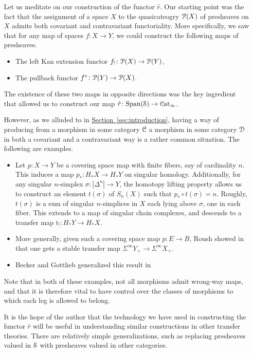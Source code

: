 \documentclass[main.tex]{subfiles}
\begin{document}
Let us meditate on our construction of the functor $\hat{r}$. Our starting point was the fact that the assignment of a space $X$ to the quasicateogry $\P(X)$ of presheaves on $X$ admits both covariant and contravariant functoriality. More specifically, we saw that for any map of spaces $f\colon X \to Y$, we could construct the following maps of presheaves.
\begin{itemize}
  \item The left Kan extension functor $f_{!}\colon \P(X) \to \P(Y)$,

  \item The pullback functor $f^{*}\colon \P(Y) \to \P(X)$.
\end{itemize}
The existence of these two maps in opposite directions was the key ingredient that allowed us to construct our map $\hat{r}\colon \Span(\S) \to \ICat$.

However, as we alluded to in \hyperref[sec:introduction]{Section~\ref*{sec:introduction}}, having a way of producing from a morphism in some category $\category{C}$ a morphism in some category $\category{D}$ in both a covariant and a contravariant way is a rather common situation. The following are examples.

\begin{itemize}
  \item Let $p\colon X \to Y$ be a covering space map with finite fibers, say of cardinality $n$. This induces a map $p_{*}\colon H_{*}X \to H_{*}Y$ on singular homology. Additionally, for any singular $n$-simplex $\sigma\colon |\Delta^{n}| \to Y$, the homotopy lifting property allows us to construct an element $t(\sigma)$ of $S_{n}(X)$ such that $p_{*} \circ t(\sigma) = n$. Roughly, $t(\sigma)$ is a sum of singular $n$-simplices in $X$ each lying above $\sigma$, one in each fiber. This extends to a map of singular chain complexes, and descends to a transfer map $t_{!}\colon H_{*}Y \to H_{*}X$.

  \item More generally, given such a covering space map $p\colon E \to B$, Roush showed in \cite{roushtransfer} that one gets a stable transfer map $\Sigma^{\infty} Y_{+} \to \Sigma^{\infty} X_{+}$.

  \item Becker and Gottlieb generalized this result in
\end{itemize}

Note that in both of these examples, not all morphisms admit wrong-way maps, and that it is therefore vital to have control over the classes of morphisms to which each leg is allowed to belong.

It is the hope of the author that the technology we have used in constructing the functor $\hat{r}$ will be useful in understanding similar constructions in other transfer theories. There are relatively simple generalizations, such as replacing presheaves valued in $\S$ with presheaves valued in other categories.
\end{document}
